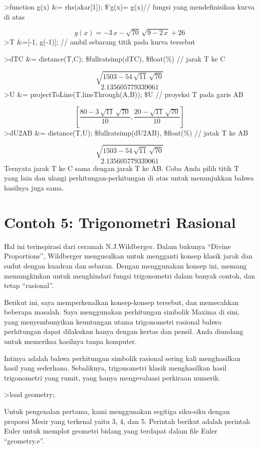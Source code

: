 \documentclass[
]{book}
\begin{document}
\textgreater function g(x) \&= rhs(akar{[}1{]}); \$'g(x)= g(x)// fungsi yang mendefinisikan kurva di atas

\[g\left(x\right)=-3\,x-\sqrt{70}\,\sqrt{9-2\,x}+26\]\textgreater T \&={[}-1, g(-1){]}; // ambil sebarang titik pada kurva tersebut

\textgreater dTC \&= distance(T,C); \$fullratsimp(dTC), \$float(\%) // jarak T ke C

\[\sqrt{1503-54\,\sqrt{11}\,\sqrt{70}}\] \[2.135605779339061\]\textgreater U \&= projectToLine(T,lineThrough(A,B)); \$U // proyeksi T pada garis AB

\[\left[ \frac{80-3\,\sqrt{11}\,\sqrt{70}}{10} , \frac{20-\sqrt{11}\,\sqrt{70}}{10} \right]\]\textgreater dU2AB \&= distance(T,U); \$fullratsimp(dU2AB), \$float(\%) // jatak T ke AB

\[\sqrt{1503-54\,\sqrt{11}\,\sqrt{70}}\] \[2.135605779339061\]Ternyata jarak T ke C sama dengan jarak T ke AB. Coba Anda pilih titik T yang lain dan ulangi perhitungan-perhitungan di atas untuk menunjukkan bahwa hasilnya juga sama.

\chapter{Contoh 5: Trigonometri Rasional}\label{contoh-5-trigonometri-rasional}

Hal ini terinspirasi dari ceramah N.J.Wildberger. Dalam bukunya ``Divine Proportions'', Wildberger mengusulkan untuk mengganti konsep klasik jarak dan sudut dengan kuadran dan sebaran. Dengan menggunakan konsep ini, memang memungkinkan untuk menghindari fungsi trigonometri dalam banyak contoh, dan tetap ``rasional''.

Berikut ini, saya memperkenalkan konsep-konsep tersebut, dan memecahkan beberapa masalah. Saya menggunakan perhitungan simbolik Maxima di sini, yang menyembunyikan keuntungan utama trigonometri rasional bahwa perhitungan dapat dilakukan hanya dengan kertas dan pensil. Anda diundang untuk memeriksa hasilnya tanpa komputer.

Intinya adalah bahwa perhitungan simbolik rasional sering kali menghasilkan hasil yang sederhana. Sebaliknya, trigonometri klasik menghasilkan hasil trigonometri yang rumit, yang hanya mengevaluasi perkiraan numerik.

\textgreater load geometry;

Untuk pengenalan pertama, kami menggunakan segitiga siku-siku dengan proporsi Mesir yang terkenal yaitu 3, 4, dan 5. Perintah berikut adalah perintah Euler untuk memplot geometri bidang yang terdapat dalam file Euler ``geometry.e''.
\end{document}
